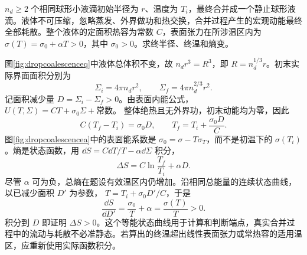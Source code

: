 \begin{example}[液滴合并时的温升与熵变]
\label{ex:dropcoalescence}
$n_d\ge2$ 个相同球形小液滴初始半径为 $r$、温度为 $T_i$，最终合并成一个静止球形液滴。液体不可压缩，忽略蒸发、外界做功和热交换，合并过程产生的宏观动能最终全部耗散。整个液体的定面积热容为常数 $C$，表面张力在所涉温区内为 $\sigma(T)=\sigma_0+\alpha T>0$，其中 $\sigma_0>0$。求终半径、终温和熵变。
\end{example}
\begin{solution}
图\ref{fig:dropcoalescenceq}中液体总体积不变，故
$n_dr^3=R^3$，即 $R=n_d^{1/3}r$。初末实际界面面积分别为
\[
 \Sigma_i=4\pi n_dr^2,\qquad
 \Sigma_f=4\pi n_d^{2/3}r^2.
\]
记面积减少量 $D=\Sigma_i-\Sigma_f>0$。由表面内能公式，
$U(T,\Sigma)=CT+\sigma_0\Sigma+\text{常数}$。
整体绝热且无外界功，初末动能均为零，因此
\[
 C(T_f-T_i)=\sigma_0D,\qquad
 T_f=T_i+\frac{\sigma_0D}{C}.
\]
图\ref{fig:dropcoalescencea}中的表面能系数是 $\sigma_0=\sigma-T\sigma_T$，而不是初温下的 $\sigma(T_i)$。熵是状态函数，用
$\dd S=C\dd T/T-\alpha\dd\Sigma$ 积分，
\[
 \Delta S=C\ln\frac{T_f}{T_i}+\alpha D.
\]
尽管 $\alpha$ 可为负，总熵在题设有效温区内仍增加。沿相同总能量的连续状态曲线，以已减少面积 $D'$ 为参数，
$T=T_i+\sigma_0D'/C$，于是
\[
 \frac{\dd S}{\dd D'}=\frac{\sigma_0}{T}+\alpha
 =\frac{\sigma(T)}T>0.
\]
积分到 $D$ 即证明 $\Delta S>0$。这个等能状态曲线用于计算和判断端点，真实合并过程中的流动与耗散不必准静态。若算出的终温超出线性表面张力或常热容的适用温区，应重新使用实际函数积分。
\end{solution}

